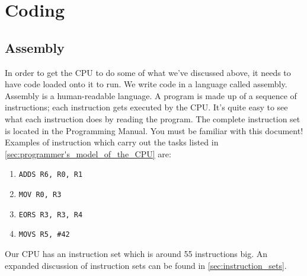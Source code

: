 \chapter{Coding}

\section{Assembly}

In order to get the CPU to do some of what we've discussed above, it needs to have code loaded onto it to run. We write code in a language called assembly. Assembly is a human-readable language. A program is made up of a sequence of instructions; each instruction gets executed by the CPU. It's quite easy to see what each instruction does by reading the program.  The complete instruction set is located in the Programming Manual. You must be familiar with this document! Examples of instruction which carry out the tasks listed in \autoref{sec:programmer's_model_of_the_CPU} are:
\begin{enumerate}
  \item \texttt{ADDS R6, R0, R1}
  \item \texttt{MOV R0, R3}
  \item \texttt{EORS R3, R3, R4}
  \item \texttt{MOVS R5, \#42}
\end{enumerate}

Our CPU has an instruction set which is around 55 instructions big. An expanded discussion of instruction sets can be found in \autoref{sec:instruction_sets}.

